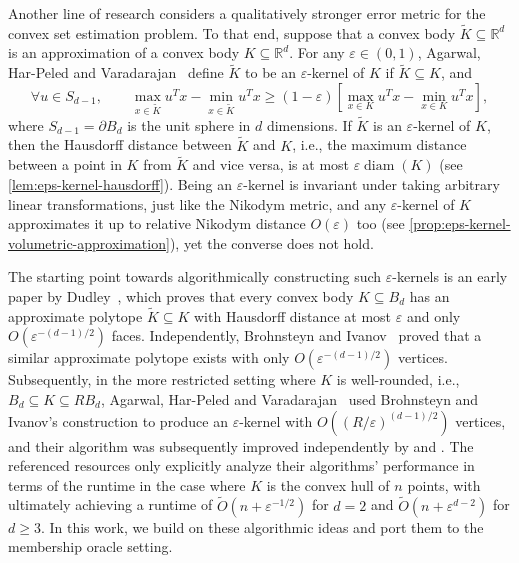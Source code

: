 \documentclass[11pt]{article}
\newcommand{\R}{\ensuremath{\mathbb{R}}}
\DeclareMathOperator{\diam}{diam}
\begin{document}
    Another line of research considers a qualitatively stronger error metric for the convex set estimation problem. To that end, suppose that a convex body $\widetilde{K} \subseteq \R^d$ is an approximation of a convex body $K \subseteq \R^d$. For any $\varepsilon \in (0,1)$, Agarwal, Har-Peled and Varadarajan~\cite{agarwal2004approximating} define $\widetilde{K}$ to be an $\varepsilon$-kernel of $K$ if $\widetilde{K} \subseteq K$, and
    \[\forall u \in S_{d-1}, \qquad \max_{x \in \widetilde{K}} u^Tx - \min_{x \in \widetilde{K}} u^Tx \geq (1-\varepsilon)\left[\max_{x \in K} u^Tx - \min_{x \in K} u^Tx\right],\]
    where $S_{d-1} = \partial B_d$ is the unit sphere in $d$ dimensions. If $\widetilde{K}$ is an $\varepsilon$-kernel of $K$, then the Hausdorff distance between $\widetilde{K}$ and $K$, i.e., the maximum distance between a point in $K$ from $\widetilde{K}$ and vice versa, is at most $\varepsilon\diam(K)$ (see \cref{lem:eps-kernel-hausdorff}). Being an $\varepsilon$-kernel is invariant under taking arbitrary linear transformations, just like the Nikodym metric, and any $\varepsilon$-kernel of $K$ approximates it up to relative Nikodym distance $O(\varepsilon)$ too (see \cref{prop:eps-kernel-volumetric-approximation}), yet the converse does not hold.

    The starting point towards algorithmically constructing such $\varepsilon$-kernels is an early paper by Dudley~\cite{dudley1974metric,har2019proof}, which proves that every convex body $K \subseteq B_d$ has an approximate polytope $\widetilde{K} \subseteq K$ with Hausdorff distance at most $\varepsilon$ and only $O(\varepsilon^{-(d-1)/2})$ faces. Independently, Brohnsteyn and Ivanov~\cite{bronshteyn1975approximation} proved that a similar approximate polytope exists with only $O(\varepsilon^{-(d-1)/2})$ vertices. Subsequently, in the more restricted setting where $K$ is well-rounded, i.e., $B_d \subseteq K \subseteq RB_d$, Agarwal, Har-Peled and Varadarajan~\cite{agarwal2004approximating} used Brohnsteyn and Ivanov's construction to produce an $\varepsilon$-kernel with $O((R/\varepsilon)^{(d-1)/2})$ vertices, and their algorithm was subsequently improved independently by \cite{chan2006faster} and \cite{yu2008practical}. The referenced resources only explicitly analyze their algorithms' performance in terms of the runtime in the case where $K$ is the convex hull of $n$ points, with \cite{yu2008practical} ultimately achieving a runtime of $\widetilde{O}(n + \varepsilon^{-1/2})$ for $d = 2$ and $\widetilde{O}(n + \varepsilon^{d-2})$ for $d \geq 3$. In this work, we build on these algorithmic ideas and port them to the membership oracle setting.
\end{document}

